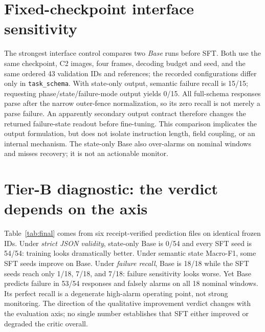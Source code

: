 \documentclass{article}
\begin{document}
\section{Fixed-checkpoint interface sensitivity}
The strongest interface control compares two \emph{Base} runs before SFT. Both use the same checkpoint, C2 images, four frames, decoding budget and seed, and the same ordered 43 validation IDs and references; the recorded configurations differ only in \texttt{task\_schema}. With state-only output, semantic failure recall is 15/15; requesting phase/state/failure-mode output yields 0/15. All full-schema responses parse after the narrow outer-fence normalization, so its zero recall is not merely a parse failure. An apparently secondary output contract therefore changes the returned failure-state readout before fine-tuning. This comparison implicates the output formulation, but does not isolate instruction length, field coupling, or an internal mechanism. The state-only Base also over-alarms on nominal windows and misses recovery; it is not an actionable monitor.

\section{Tier-B diagnostic: the verdict depends on the axis}
Table~\ref{tab:final} comes from six receipt-verified prediction files on identical frozen IDs. Under \emph{strict JSON validity}, state-only Base is 0/54 and every SFT seed is 54/54: training looks dramatically better. Under semantic state Macro-F1, some SFT seeds improve on Base. Under \emph{failure recall}, Base is 18/18 while the SFT seeds reach only 1/18, 7/18, and 7/18: failure sensitivity looks worse. Yet Base predicts failure in 53/54 responses and falsely alarms on all 18 nominal windows. Its perfect recall is a degenerate high-alarm operating point, not strong monitoring. The direction of the qualitative improvement verdict changes with the evaluation axis; no single number establishes that SFT either improved or degraded the critic overall.

\begin{table}[t]
\centering\scriptsize
\resizebox{\textwidth}{!}{}
\caption{Frozen internal Tier-B diagnostic: 54 windows from six episodes, 18 per state. F-rec and F-prec use the semantic protocol; N-FA counts nominal windows labeled failure. Pred N/F/R/I lists nominal, failure, recovery, and invalid semantic responses. Strict JSON is a separate protocol measure.}
\label{tab:final}
\end{table}
\end{document}
